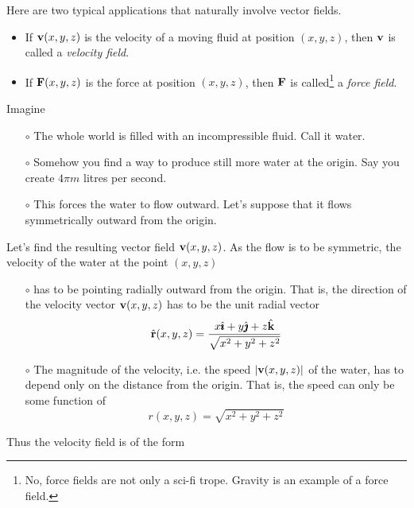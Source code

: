 Here are two typical applications that naturally involve vector fields.
\begin{itemize}
\item
If $\mathbf{v}(x,y,z)$ is the velocity of a moving fluid at position $(x,y,z)$, 
then $\mathbf{v}$ is called a \emph{velocity field}.

\item
If $\mathbf{F}(x,y,z)$ is the force at position $(x,y,z)$, 
then $\mathbf{F}$ is called\footnote{No, force fields are not 
only a sci-fi trope.
Gravity is an example of a 
force field.} a \emph{force field}.

\end{itemize}


\begin{eg}\label{eg:ptSource}
Imagine
\begin{itemize}\itemsep1pt \parskip0pt  %
\item[$\circ$]
The whole world  is filled with an incompressible fluid. Call it water.
\item[$\circ$]
Somehow you find a way to produce still more water at the origin. Say you
create $4\pi m$ litres per second.
\item[$\circ$] This forces the water to flow outward. Let's suppose that
it flows symmetrically outward from the origin.
\end{itemize}
Let's find the resulting vector field $\mathbf{v}(x,y,z)$. As the flow is to be 
symmetric, the velocity of the water at the point $(x,y,z)$
\begin{itemize}\itemsep1pt \parskip0pt  %
\item[$\circ$]
has to be pointing radially outward from the origin. That is, the
direction of the velocity vector $\mathbf{v}(x,y,z)$ has to be the unit radial vector 
\begin{equation*}
\hat{\mathbf{r}}(x,y,z) = \frac{x\hat{\pmb{\imath}} + y\hat{\pmb{\jmath}} + z\hat{\mathbf{k}}}{\sqrt{x^2+y^2+z^2}}
\end{equation*}
\item[$\circ$] 
The magnitude of the velocity, i.e. the speed $|\mathbf{v}(x,y,z)|$ of the water,
has to depend only on the distance from the origin. That is, the 
speed can only be some function of
\begin{equation*}
r(x,y,z) = \sqrt{x^2+y^2+z^2}
\end{equation*}
\end{itemize}
Thus the velocity field is of the form
\begin{equation*}

\end{equation*}
\end{eg}
